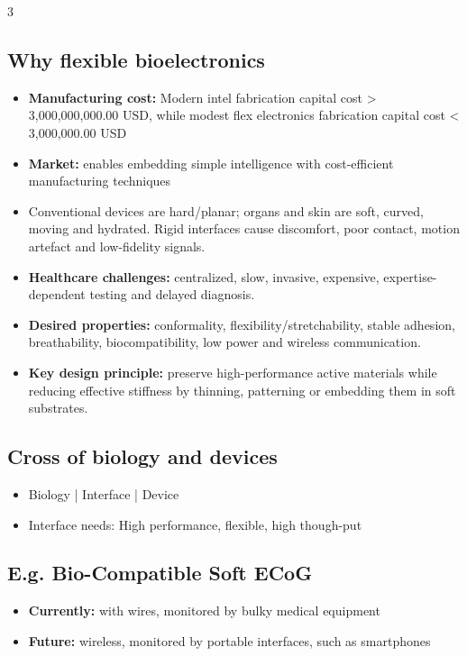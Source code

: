 \documentclass[10pt,a4paper]{ctexart}
\newcommand{\key}[1]{\textbf{#1}}
\begin{document}
\begin{multicols*}{3}
\subsection{Why flexible bioelectronics}
\begin{itemize}
  \item \key{Manufacturing cost:} Modern intel fabrication capital cost > 3,000,000,000.00 USD, 
  while modest flex electronics fabrication capital cost < 3,000,000.00 USD
  \item \key{Market:} enables embedding simple intelligence with cost-efficient manufacturing techniques 
  \item Conventional devices are hard/planar; organs and skin are soft,
  curved, moving and hydrated. Rigid interfaces cause discomfort, poor
  contact, motion artefact and low-fidelity signals.
  \item \key{Healthcare challenges:} centralized, slow, invasive, expensive,
  expertise-dependent testing and delayed diagnosis.
  \item \key{Desired properties:} conformality, flexibility/stretchability,
  stable adhesion, breathability, biocompatibility, low power and wireless
  communication.
  \item \key{Key design principle:} preserve high-performance active materials
  while reducing effective stiffness by thinning, patterning or embedding
  them in soft substrates.
\end{itemize}

\subsection{Cross of biology and devices}
\begin{itemize}
  \item Biology | Interface | Device
  \item Interface needs: High performance, flexible, high though-put
\end{itemize}

\subsection{E.g. Bio-Compatible Soft ECoG}
\begin{itemize}
  \item \key{Currently:} with wires, monitored by bulky medical equipment
  \item \key{Future:} wireless, monitored by portable interfaces, such as smartphones
\end{itemize}


\end{multicols*}
\end{document}
